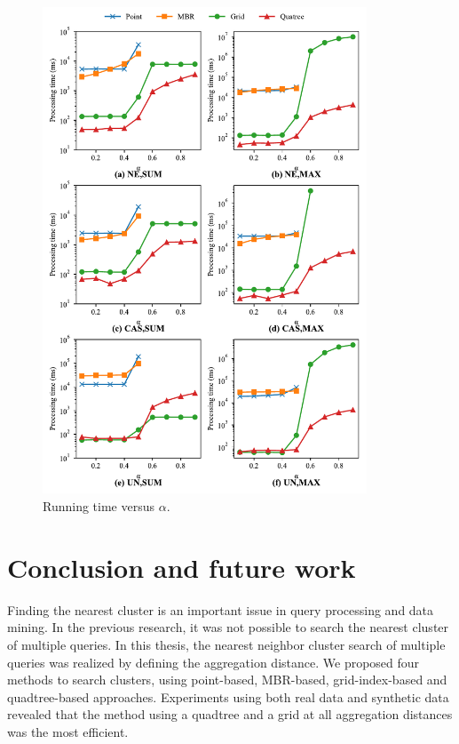 \documentclass[a4paper,11pt]{report}
\theoremstyle{mytheoremstyle}
\begin{document}
\begin{figure}
    \begin{center}
        \includegraphics[width=0.86\textwidth]{matplotlib/export/alpha.pdf}
    \end{center}
    \caption{Running time versus $\alpha$.}
    \label{fig:alpha}
\end{figure}

\chapter{Conclusion and future work}
\label{section:conclusion}

Finding the nearest cluster is an important issue in query processing and data mining. In the previous research, it was not possible to search the nearest cluster of multiple queries. In this thesis, the nearest neighbor cluster search of multiple queries was realized by defining the aggregation distance. We proposed four methods to search clusters, using point-based, MBR-based, grid-index-based and quadtree-based approaches. Experiments using both real data and synthetic data revealed that the method using a quadtree and a grid at all aggregation distances was the most efficient.
\end{document}
